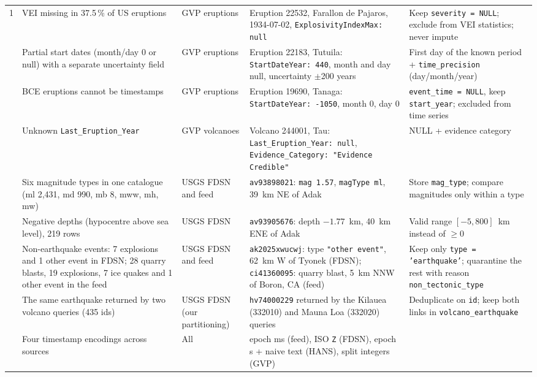 \documentclass[11pt,a4paper]{article}
\begin{document}
\begin{longtable}{@{}L{0.5cm}L{3.5cm}L{2.0cm}L{4.6cm}L{4.1cm}@{}}
1 & VEI missing in 37.5\,\% of US eruptions & GVP eruptions &
Eruption 22532, Farallon de Pajaros, 1934-07-02, \texttt{ExplosivityIndexMax: null} &
Keep \texttt{severity = NULL}; exclude from VEI statistics; never impute \\
 & Partial start dates (month/day 0 or null) with a separate uncertainty field &
GVP eruptions &
Eruption 22183, Tutuila: \texttt{StartDateYear: 440}, month and day null, uncertainty
$\pm$200 years &
First day of the known period + \texttt{time\_precision} (day/month/year) \\
 & BCE eruptions cannot be timestamps & GVP eruptions &
Eruption 19690, Tanaga: \texttt{StartDateYear: -1050}, month 0, day 0 &
\texttt{event\_time = NULL}, keep \texttt{start\_year}; excluded from time series \\
 & Unknown \texttt{Last\_Eruption\_Year} & GVP volcanoes &
Volcano 244001, Tau: \texttt{Last\_Eruption\_Year: null},
\texttt{Evidence\_Category: "Evidence Credible"} &
NULL + evidence category \\
 & Six magnitude types in one catalogue (ml 2{,}431, md 990, mb 8, mww, mh, mw) &
USGS FDSN and feed &
\texttt{av93898021}: \texttt{mag 1.57}, \texttt{magType ml}, 39~km NE of Adak &
Store \texttt{mag\_type}; compare magnitudes only within a type \\
 & Negative depths (hypocentre above sea level), 219 rows & USGS FDSN &
\texttt{av93905676}: depth $-1.77$~km, 40~km ENE of Adak &
Valid range $[-5, 800]$~km instead of $\geq 0$ \\
 & Non-earthquake events: 7 explosions and 1 other event in FDSN; 28 quarry blasts,
19 explosions, 7 ice quakes and 1 other event in the feed & USGS FDSN and feed &
\texttt{ak2025xwucwj}: type \texttt{"other event"}, 62~km W of Tyonek (FDSN);
\texttt{ci41360095}: quarry blast, 5~km NNW of Boron, CA (feed) &
Keep only \texttt{type = 'earthquake'}; quarantine the rest with reason
\texttt{non\_tectonic\_type} \\
 & The same earthquake returned by two volcano queries (435 ids) &
USGS FDSN (our partitioning) &
\texttt{hv74000229} returned by the Kilauea (332010) and Mauna Loa (332020) queries &
Deduplicate on \texttt{id}; keep both links in \texttt{volcano\_earthquake} \\
 & Four timestamp encodings across sources & All &
epoch ms (feed), ISO \texttt{Z} (FDSN), epoch s + naive text (HANS), split integers
(GVP) &

\end{longtable}
\end{document}
